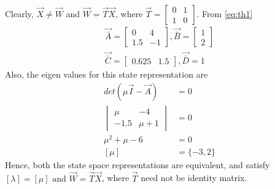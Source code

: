 \documentclass[journal,12pt,twocolumn]{IEEEtran}
\begin{document}
Clearly, $\vec{X}\neq \vec{W}$ and $\vec{W}=\vec{T}\vec{X}$, where $\vec{T}=\begin{bmatrix}
0 & 1\\
1 & 0
\end{bmatrix}$. From \eqref{eq:th1}
\begin{align}
    \vec{\bar A}=\begin{bmatrix}
    0 & 4\\
    1.5 & -1
    \end{bmatrix},\vec{\bar B}=\begin{bmatrix}
    1\\
    2
    \end{bmatrix}\\
    \vec{\bar C}=\begin{bmatrix}
    0.625 & 1.5
    \end{bmatrix},\vec{\bar D}=1
\end{align}
Also, the eigen values for this state representation are
\begin{align}
    det(\mu \vec{I}-\vec{A})&=0\\
    \begin{vmatrix}
    \mu & -4\\
    -1.5 & \mu+1
    \end{vmatrix}&=0\\
    \mu^2+\mu-6&=0\\
    [\mu]&=\{-3,2\}
\end{align}
Hence, both the state space representations are equivalent, and satisfy $[\lambda]=[\mu] \text{ and } \vec{W}=\vec{T}\vec{X}$, where $\vec{T}$ need not be identity matrix.
\end{document}
